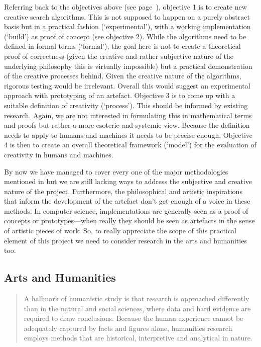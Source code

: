 \documentclass[11pt]{thesis} %
\begin{document}
Referring back to the objectives above (see page~\pageref{s:objectives}), objective \num{1} is to create new creative search algorithms. This is not supposed to happen on a purely abstract basis but in a practical fashion (`experimental'), with a working implementation (`build') as proof of concept (see objective 2). While the algorithms need to be defined in formal terms (`formal'), the goal here is not to create a theoretical proof of correctness (given the creative and rather subjective nature of the underlying philosophy this is virtually impossible) but a practical demonstration of the creative processes behind. Given the creative nature of the algorithms, rigorous testing would be irrelevant. Overall this would suggest an experimental approach with prototyping of an artefact. Objective \num{3} is to come up with a suitable definition of creativity (`process'). This should be informed by existing research. Again, we are not interested in formulating this in mathematical terms and proofs but rather a more esoteric and systemic view. Because the definition needs to apply to humans and machines it needs to be precise enough. Objective \num{4} is then to create an overall theoretical framework (`model') for the evaluation of creativity in humans and machines.

By now we have managed to cover every one of the major methodologies mentioned in \autocite{Amaral} but we are still lacking ways to address the subjective and creative nature of the project. Furthermore, the philosophical and artistic inspirations that inform the development of the artefact don't get enough of a voice in these methods. In computer science, implementations are generally seen as a proof of concepts or prototypes---when really they should be seen as artefacts in the sense of artistic pieces of work. So, to really appreciate the scope of this practical element of this project we need to consider research in the arts and humanities too.


\subsection{Arts and Humanities}


\begin{quotation}
  A hallmark of humanistic study is that research is approached differently than in the natural and social sciences, where data and hard evidence are required to draw conclusions. Because the human experience cannot be adequately captured by facts and figures alone, humanities research employs methods that are historical, interpretive and analytical in nature. 
\end{quotation}
\end{document}
